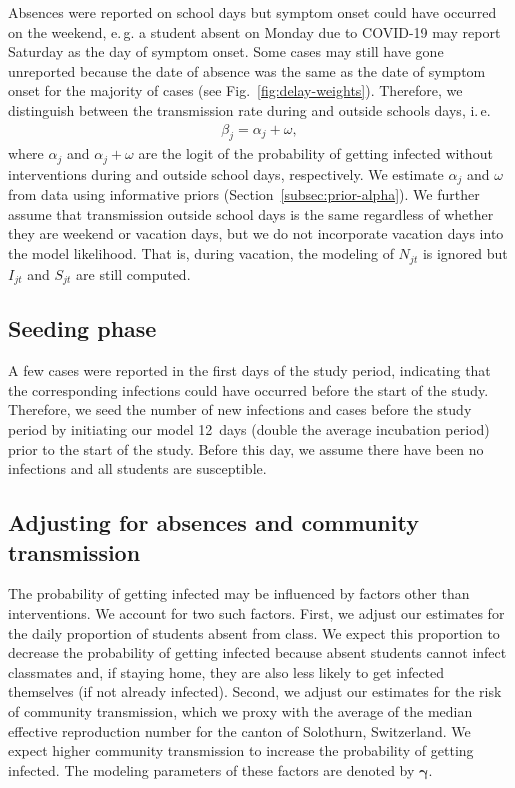\documentclass[fleqn,11pt]{wlscirep_supp}
\newcommand\ie{i.\,e.\xspace}
\newcommand\eg{e.\,g.\xspace}
\begin{document}
Absences were reported on school days but symptom onset could have occurred on the weekend, \eg a student absent on Monday due to COVID-19 may report Saturday as the day of symptom onset. Some cases may still have gone unreported because the date of absence was the same as the date of symptom onset for the majority of cases (see Fig.~\ref{fig:delay-weights}). Therefore, we distinguish between the transmission rate during and outside schools days, \ie 
\begin{align}
    \beta_j = \alpha_j + \omega, 
\end{align}
where $\alpha_j$ and $\alpha_j + \omega$ are the logit of the probability of getting infected without interventions during and outside school days, respectively. We estimate $\alpha_j$ and $\omega$ from data using informative priors (Section~\ref{subsec:prior-alpha}). We further assume that transmission outside school days is the same regardless of whether they are weekend or vacation days, but we do not incorporate vacation days into the model likelihood. That is, during vacation, the modeling of $N_{jt}$ is ignored but $I_{jt}$ and $S_{jt}$ are still computed.  


\subsection{Seeding phase}

A few cases were reported in the first days of the study period, indicating that the corresponding infections could have occurred before the start of the study. Therefore, we seed the number of new infections and cases before the study period by initiating our model 12~days (double the average incubation period) prior to the start of the study. Before this day, we assume there have been no infections and all students are susceptible.


\subsection{Adjusting for absences and community transmission}

The probability of getting infected may be influenced by factors other than interventions. We account for two such factors. First, we adjust our estimates for the daily proportion of students absent from class. We expect this proportion to decrease the probability of getting infected because absent students cannot infect classmates and, if staying home, they are also less likely to get infected themselves (if not already infected). Second, we adjust our estimates for the risk of community transmission, which we proxy with the average of the median effective reproduction number for the canton of Solothurn, Switzerland\cite{Scire2022}. We expect higher community transmission to increase the probability of getting infected. The modeling parameters of these factors are denoted by $\bm{\gamma}$.
\end{document}

